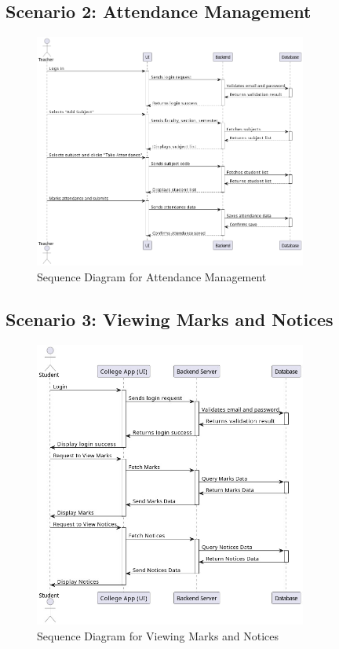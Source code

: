 \subsection{Scenario 2: Attendance Management}
\begin{figure}[H]
    \centering
    \includegraphics[width=0.8\textwidth]{Graphics/Sequence_Diagram_Teacher_Takes_Attendance.png}
    \caption{Sequence Diagram for Attendance Management}
    \label{fig:sequence_diagram_attendance}
\end{figure}

\subsection{Scenario 3: Viewing Marks and Notices}
\begin{figure}[H]
    \centering
    \includegraphics[width=0.8\textwidth]{Graphics/seq_dig_for_viewing_marks_and_attendance.jpg}
    \caption{Sequence Diagram for Viewing Marks and Notices}
    \label{fig:sequence_diagram_marks_notices}
\end{figure}

